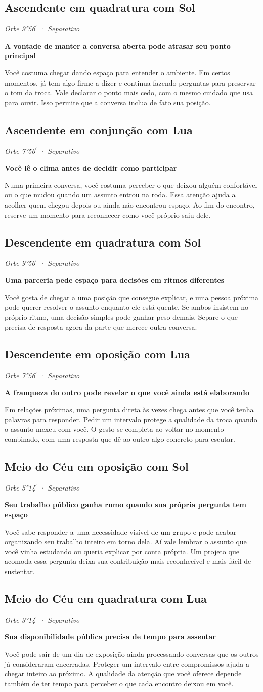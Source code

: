 \documentclass[11pt,a4paper]{article}
\newcommand{\leitura}[3]{\subsection{#1}\textit{#2}\par #3}
\newcommand{\subtituloleitura}[1]{\textbf{#1}\par\nopagebreak[4]}
\begin{document}
\leitura{Ascendente em quadratura com Sol}{Orbe 9°56\ensuremath{^{\prime}} · Separativo}{
\subtituloleitura{A vontade de manter a conversa aberta pode atrasar seu ponto principal}
Você costuma chegar dando espaço para entender o ambiente. Em certos momentos, já tem algo firme a dizer e continua fazendo perguntas para preservar o tom da troca. Vale declarar o ponto mais cedo, com o mesmo cuidado que usa para ouvir. Isso permite que a conversa inclua de fato sua posição.
}

\leitura{Ascendente em conjunção com Lua}{Orbe 7°56\ensuremath{^{\prime}} · Separativo}{
\subtituloleitura{Você lê o clima antes de decidir como participar}
Numa primeira conversa, você costuma perceber o que deixou alguém confortável ou o que mudou quando um assunto entrou na roda. Essa atenção ajuda a acolher quem chegou depois ou ainda não encontrou espaço. Ao fim do encontro, reserve um momento para reconhecer como você próprio saiu dele.
}

\leitura{Descendente em quadratura com Sol}{Orbe 9°56\ensuremath{^{\prime}} · Separativo}{
\subtituloleitura{Uma parceria pede espaço para decisões em ritmos diferentes}
Você gosta de chegar a uma posição que consegue explicar, e uma pessoa próxima pode querer resolver o assunto enquanto ele está quente. Se ambos insistem no próprio ritmo, uma decisão simples pode ganhar peso demais. Separe o que precisa de resposta agora da parte que merece outra conversa.
}

\leitura{Descendente em oposição com Lua}{Orbe 7°56\ensuremath{^{\prime}} · Separativo}{
\subtituloleitura{A franqueza do outro pode revelar o que você ainda está elaborando}
Em relações próximas, uma pergunta direta às vezes chega antes que você tenha palavras para responder. Pedir um intervalo protege a qualidade da troca quando o assunto mexeu com você. O gesto se completa ao voltar no momento combinado, com uma resposta que dê ao outro algo concreto para escutar.
}

\leitura{Meio do Céu em oposição com Sol}{Orbe 5°14\ensuremath{^{\prime}} · Separativo}{
\subtituloleitura{Seu trabalho público ganha rumo quando sua própria pergunta tem espaço}
Você sabe responder a uma necessidade visível de um grupo e pode acabar organizando seu trabalho inteiro em torno dela. Aí vale lembrar o assunto que você vinha estudando ou queria explicar por conta própria. Um projeto que acomoda essa pergunta deixa sua contribuição mais reconhecível e mais fácil de sustentar.
}

\leitura{Meio do Céu em quadratura com Lua}{Orbe 3°14\ensuremath{^{\prime}} · Separativo}{
\subtituloleitura{Sua disponibilidade pública precisa de tempo para assentar}
Você pode sair de um dia de exposição ainda processando conversas que os outros já consideraram encerradas. Proteger um intervalo entre compromissos ajuda a chegar inteiro ao próximo. A qualidade da atenção que você oferece depende também de ter tempo para perceber o que cada encontro deixou em você.
}
\end{document}
